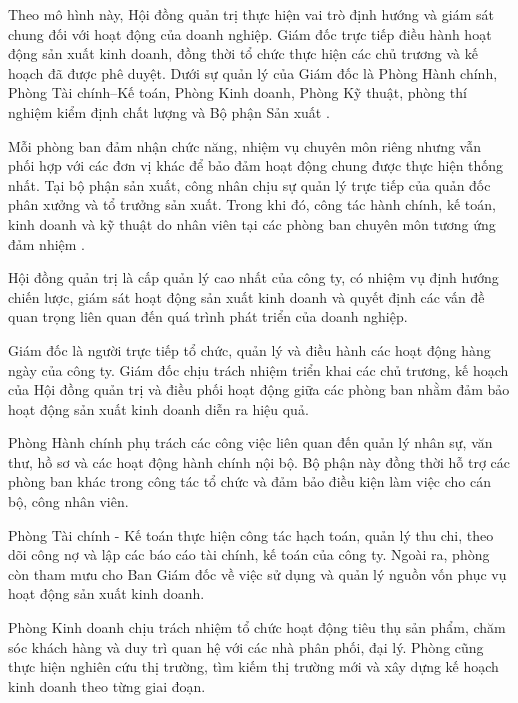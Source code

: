 Theo mô hình này, Hội đồng quản trị thực hiện vai trò định hướng và giám sát chung đối với hoạt động của doanh nghiệp. 
Giám đốc trực tiếp điều hành hoạt động sản xuất kinh doanh, đồng thời tổ chức thực hiện các chủ trương và kế hoạch đã được phê duyệt. 
Dưới sự quản lý của Giám đốc là Phòng Hành chính, Phòng Tài chính--Kế toán, Phòng Kinh doanh, Phòng Kỹ thuật, phòng thí nghiệm kiểm định chất lượng và Bộ phận Sản xuất \cite{company-internal-documents}.

Mỗi phòng ban đảm nhận chức năng, nhiệm vụ chuyên môn riêng nhưng vẫn phối hợp với các đơn vị khác để bảo đảm hoạt động chung được thực hiện thống nhất. 
Tại bộ phận sản xuất, công nhân chịu sự quản lý trực tiếp của quản đốc phân xưởng và tổ trưởng sản xuất. 
Trong khi đó, công tác hành chính, kế toán, kinh doanh và kỹ thuật do nhân viên tại các phòng ban chuyên môn tương ứng đảm nhiệm \cite{company-internal-documents}.

{\renewcommand{\figurename}{Sơ đồ}
\renewcommand{\thefigure}{\arabic{figure}}

}

Hội đồng quản trị là cấp quản lý cao nhất của công ty, có nhiệm vụ định hướng chiến lược, giám sát hoạt động sản xuất kinh doanh và quyết định các vấn đề quan trọng liên quan đến quá trình phát triển của doanh nghiệp.


Giám đốc là người trực tiếp tổ chức, quản lý và điều hành các hoạt động hàng ngày của công ty. 
Giám đốc chịu trách nhiệm triển khai các chủ trương, kế hoạch của Hội đồng quản trị và điều phối hoạt động giữa các phòng ban nhằm đảm bảo hoạt động sản xuất kinh doanh diễn ra hiệu quả.

Phòng Hành chính phụ trách các công việc liên quan đến quản lý nhân sự, văn thư, hồ sơ và các hoạt động hành chính nội bộ. 
Bộ phận này đồng thời hỗ trợ các phòng ban khác trong công tác tổ chức và đảm bảo điều kiện làm việc cho cán bộ, công nhân viên.

Phòng Tài chính - Kế toán thực hiện công tác hạch toán, quản lý thu chi, theo dõi công nợ và lập các báo cáo tài chính, kế toán của công ty. 
Ngoài ra, phòng còn tham mưu cho Ban Giám đốc về việc sử dụng và quản lý nguồn vốn phục vụ hoạt động sản xuất kinh doanh.

Phòng Kinh doanh chịu trách nhiệm tổ chức hoạt động tiêu thụ sản phẩm, chăm sóc khách hàng và duy trì quan hệ với các nhà phân phối, đại lý. 
Phòng cũng thực hiện nghiên cứu thị trường, tìm kiếm thị trường mới và xây dựng kế hoạch kinh doanh theo từng giai đoạn.

